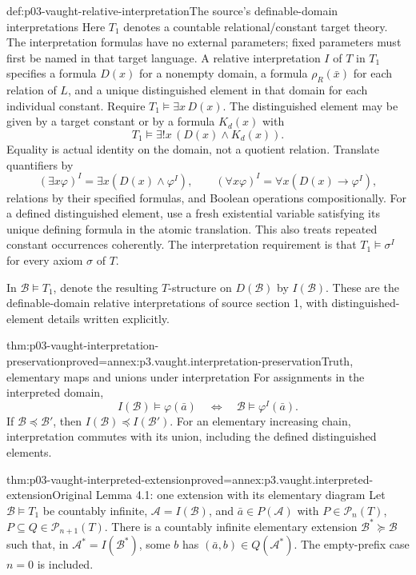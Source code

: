 \begin{hbdefinition}{def:p03-vaught-relative-interpretation}{The source's definable-domain interpretations}
Here \(T_1\) denotes a countable relational/constant target theory.
The interpretation formulas have no external parameters; fixed
parameters must first be named in that target language.
A relative interpretation \(I\) of \(T\) in \(T_1\) specifies a
formula \(D(x)\) for a nonempty domain, a formula \(\rho_R(\bar x)\)
for each relation of \(L\), and a unique distinguished element
in that domain for each individual constant.
Require \(T_1\models\exists x\,D(x)\).
The distinguished element may be given by a target constant or
by a formula \(K_d(x)\) with
\[
                 T_1\models\exists!x\,(D(x)\land K_d(x)).
\]
Equality is actual identity on the domain, not a quotient relation.
Translate quantifiers by
\[
 (\exists x\varphi)^I=\exists x(D(x)\land\varphi^I),\qquad
 (\forall x\varphi)^I=\forall x(D(x)\to\varphi^I),
\]
relations by their specified formulas, and Boolean operations
compositionally. For a defined distinguished element, use a fresh
existential variable satisfying its unique defining formula in the
atomic translation. This also treats repeated constant occurrences
coherently. The interpretation requirement is that
\(T_1\models\sigma^I\) for every axiom \(\sigma\) of \(T\).

In \(\mathcal B\models T_1\), denote the resulting \(T\)-structure
on \(D(\mathcal B)\) by \(I(\mathcal B)\).
These are the definable-domain relative interpretations of source
section 1, with distinguished-element details written explicitly.
\end{hbdefinition}

\begin{hblemma}{thm:p03-vaught-interpretation-preservation}{proved=annex:p3.vaught.interpretation-preservation}{Truth, elementary maps and unions under interpretation}
For assignments in the interpreted domain,
\[
 I(\mathcal B)\models\varphi(\bar a)
                 \quad\Longleftrightarrow\quad
 \mathcal B\models\varphi^I(\bar a).
\]
If \(\mathcal B\preccurlyeq\mathcal B'\), then
\(I(\mathcal B)\preccurlyeq I(\mathcal B')\).
For an elementary increasing chain, interpretation commutes
with its union, including the defined distinguished elements.
\end{hblemma}

\begin{hblemma}{thm:p03-vaught-interpreted-extension}{proved=annex:p3.vaught.interpreted-extension}{Original Lemma 4.1: one extension with its elementary diagram}
Let \(\mathcal B\models T_1\) be countably infinite,
\(\mathcal A=I(\mathcal B)\), and
\(\bar a\in P(\mathcal A)\) with
\(P\in\mathcal P_n(T)\), \(P\subseteq Q\in\mathcal P_{n+1}(T)\).
There is a countably infinite elementary extension
\(\mathcal B^*\succeq\mathcal B\) such that, in
\(\mathcal A^*=I(\mathcal B^*)\), some \(b\) has
\((\bar a,b)\in Q(\mathcal A^*)\).
The empty-prefix case \(n=0\) is included.
\end{hblemma}


